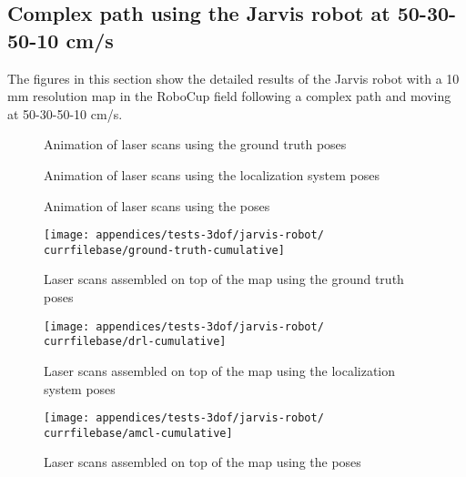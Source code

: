 \subsection{Complex path using the Jarvis robot at 50-30-50-10 cm/s}\label{subsec:appendix-a_jarvis-robot-tests_complex-path-using-the-jarvis-robot-at-50-30-50-10-cm-s}

The figures in this section show the detailed results of the Jarvis robot with a 10 mm resolution map in the RoboCup field following a complex path and moving at 50-30-50-10 cm/s.


\begin{figure}[H]
	\centering
	\caption{Animation of laser scans using the ground truth poses}
\end{figure}

\begin{figure}[H]
	\centering
	\caption{Animation of laser scans using the localization system poses}
\end{figure}

\begin{figure}[H]
	\centering
	\caption{Animation of laser scans using the  poses}
\end{figure}


\begin{figure}[H]
	\centering
	\texttt{[image: appendices/tests-3dof/jarvis-robot/\\currfilebase/ground-truth-cumulative]}
	\caption{Laser scans assembled on top of the map using the ground truth poses}
\end{figure}

\begin{figure}[H]
	\centering
	\texttt{[image: appendices/tests-3dof/jarvis-robot/\\currfilebase/drl-cumulative]}
	\caption{Laser scans assembled on top of the map using the localization system poses}
\end{figure}

\begin{figure}[H]
	\centering
	\texttt{[image: appendices/tests-3dof/jarvis-robot/\\currfilebase/amcl-cumulative]}
	\caption{Laser scans assembled on top of the map using the  poses}
\end{figure}


